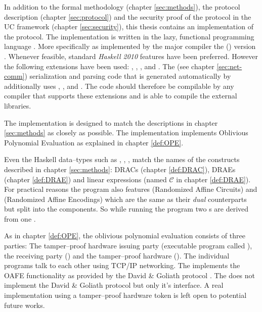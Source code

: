 \label{sec:implementation}

In addition to the formal methodology (chapter \ref{sec:methods}), the protocol
description (chapter \ref{sec:protocol}) and the security proof of the protocol
in the UC framework (chapter \ref{sec:security}), this thesis contains an
implementation of the protocol. The implementation is written in the lazy,
functional programming language \JWTLhaskell{}. More specifically \JWThaskell{}
as implemented by the major \JWThaskell{} compiler the \JWTXLghc{} (\JWTghc{})
version \JWTVghc{}. Whenever feasible, standard \emph{Haskell 2010}
\cite{haskell2010} features have been preferred. However the following
extensions have been used: ,
, , and
.  The \JWTprotobuf{} (see chapter
\ref{sec:net-comm}) serialization and parsing code that is generated
automatically by  additionally uses
, , and
. The code should therefore be compilable
by any \JWThaskell{} compiler that supports these extensions and is able to
compile the external libraries.

The implementation is designed to match the descriptions in chapter
\ref{sec:methods} as closely as possible. The implementation implements
Oblivious Polynomial Evaluation as explained in chapter \ref{def:OPE}.

Even the Haskell data--types such as , , ,
 match the names of the constructs described in chapter
\ref{sec:methods}: DRACs (chapter \ref{def:DRAC}), DRAEs (chapter
\ref{def:DRAE}) and linear expressions (named $\mathcal{C}$ in chapter
\ref{def:DRAE}). For practical reasons the program also features 
(Randomized Affine Circuits) and  (Randomized Affine Encodings)
which are the same as their \emph{dual} counterparts but split into the
components. So while running the program two s are derived from one
.

As in chapter \ref{def:OPE}, the oblivious polynomial evaluation consists of
three parties: The tamper--proof hardware issuing party \JWpOne{} (executable
program called \JWBpOne{}), the receiving party \JWpTwo{} (\JWBpTwo{}) and the
tamper--proof hardware \JWtoken{} (\JWBtoken{}). The individual programs talk to
each other using TCP/IP networking. The \JWtoken{} implements the OAFE
functionality  as provided by the David \& Goliath
protocol \cite{davidgoliath}. The \JWtoken{} does not implement the
David \& Goliath protocol but only it's interface. A real implementation using a
tamper--proof hardware token is left open to potential future works.



